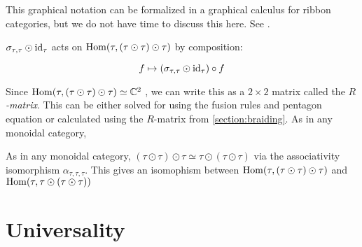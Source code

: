 This graphical notation can be formalized in a graphical calculus for ribbon
categories, but we do not have time to discuss this here. See \cite{Kirillov}. 

$\sigma_{\tau,\tau} \odot \operatorname{id}_\tau$ acts on $\operatorname{Hom}(\tau, (\tau \odot \tau) \odot \tau)$ by composition: 

\begin{equation}
f \mapsto (\sigma_{\tau,\tau} \odot \operatorname{id}_\tau) \circ f
\end{equation}

Since $\operatorname{Hom}(\tau, (\tau \odot \tau) \odot \tau) \simeq \mathbb{C}^2$ , we can
write this as a $2 \times 2$ matrix called the \emph{$R$-matrix}. This can be
either solved for using the fusion rules and pentagon equation or calculated
using the $R$-matrix from \ref{section:braiding}. As in any monoidal category, 

As in any monoidal category, $(\tau \odot \tau) \odot \tau \simeq \tau \odot
(\tau \odot \tau)$ via the associativity isomorphism $\alpha_{\tau,\tau,\tau}$.
This gives an isomophism between $\operatorname{Hom}(\tau, (\tau \odot \tau) \odot \tau)$ and
$\operatorname{Hom}(\tau, \tau \odot (\tau \odot \tau))$
\section{Universality}
